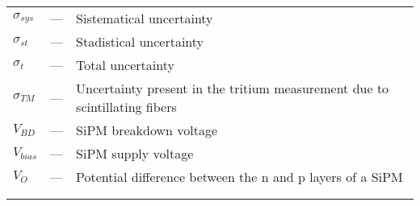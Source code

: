 \begin{longtable}{p{25mm} c p{120mm} }
$\sigma_{sys}$ & --- & Sistematical uncertainty\\
$\sigma_{st}$ & --- & Stadistical uncertainty\\
$\sigma_{t}$ & --- & Total uncertainty\\
$\sigma_{TM}$ & --- & Uncertainty present in the tritium measurement
\newline
due to scintillating fibers\\
$V_{BD}$ & --- & SiPM breakdown voltage\\
$V_{bias}$ & --- & SiPM supply voltage\\
$V_{O}$ & --- & Potential difference between the n and p layers of 
\newline
a SiPM\\
\\
\\

\end{longtable}
